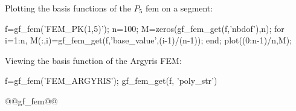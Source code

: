 \begin{cmdexamples}
  Plotting the basis functions of the $P_5$ fem on a segment:\\
  \begin{minipage}[b]{8cm}
  \begin{mcode}
f=gf_fem('FEM_PK(1,5)');
n=100; M=zeros(gf_fem_get(f,'nbdof'),n);
for i=1:n, 
  M(:,i)=gf_fem_get(f,'base_value',(i-1)/(n-1)); 
end;
plot((0:n-1)/n,M);
  \end{mcode}
  \end{minipage}  

\par
Viewing the basis function of the Argyris FEM:
\begin{mcode}
f=gf_fem('FEM_ARGYRIS');
gf_fem_get(f, 'poly_str')
\end{mcode}
\end{cmdexamples}
\begin{gfseealso}
@@gf_fem@@
\end{gfseealso}
\newpage

